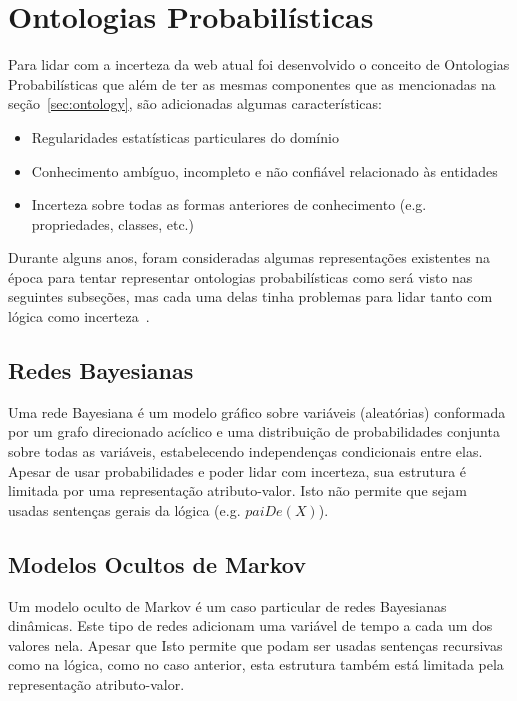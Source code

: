 \section{Ontologias Probabilísticas}
\label{sec:prob_ontology}

Para lidar com a incerteza da web atual foi desenvolvido o conceito de Ontologias Probabilísticas que além de ter as mesmas componentes que as mencionadas na seção~\ref{sec:ontology}, são adicionadas algumas características:

\begin{itemize}
	\item Regularidades estatísticas particulares do domínio
	\item Conhecimento ambíguo, incompleto e não confiável relacionado às entidades
	\item Incerteza sobre todas as formas anteriores de conhecimento (e.g. propriedades, classes, etc.)
\end{itemize}

Durante alguns anos, foram consideradas algumas representações existentes na época para tentar representar ontologias probabilísticas como será visto nas seguintes subseções, mas cada uma delas tinha problemas para lidar tanto com lógica como incerteza~\cite{Costa10}.

\subsection{Redes Bayesianas}
\label{subsec:bn}

Uma rede Bayesiana é um modelo gráfico sobre variáveis (aleatórias) conformada por um grafo direcionado acíclico e uma distribuição de probabilidades conjunta sobre todas as variáveis, estabelecendo independenças condicionais entre elas. Apesar de usar probabilidades e poder lidar com incerteza, sua estrutura é limitada por uma representação atributo-valor. Isto não permite que sejam usadas sentenças gerais da lógica (e.g. $paiDe( X )$).

\subsection{Modelos Ocultos de Markov}
\label{subsec:hmm}

Um modelo oculto de Markov é um caso particular de redes Bayesianas dinâmicas. Este tipo de redes adicionam uma variável de tempo a cada um dos valores nela. Apesar que Isto permite que podam ser usadas sentenças recursivas como na lógica, como no caso anterior, esta estrutura também está limitada pela representação atributo-valor.

